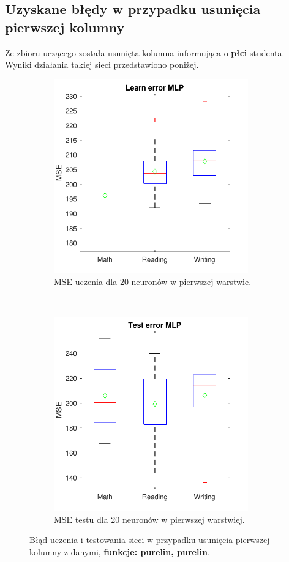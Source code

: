 \documentclass[12pt]{article}
\begin{document}
\subsection{Uzyskane błędy w przypadku usunięcia pierwszej kolumny}
Ze zbioru uczącego została usunięta kolumna informująca o \textbf{płci} studenta. Wyniki działania takiej sieci przedstawiono poniżej.

\begin{figure}[H]
\centering
\begin{subfigure}[t]{0.48\textwidth} 
\centering
\includegraphics[height=3.3in]{purelin_purelin_20_without_1_learnBoxplot.pdf}
\caption{MSE uczenia dla  20 neuronów w pierwszej warstwie.}
\end{subfigure}
~~
\begin{subfigure}[t]{0.48\textwidth} 
\centering
\includegraphics[height=3.3in]{purelin_purelin_20_without_1_testBoxplot.pdf}
\caption{MSE testu dla  20  neuronów w pierwszej warstwiej.}
\end{subfigure}

\caption{Błąd uczenia i testowania sieci w przypadku usunięcia pierwszej kolumny z danymi, \textbf{funkcje: purelin, purelin}.}
\end{figure}
\end{document}
